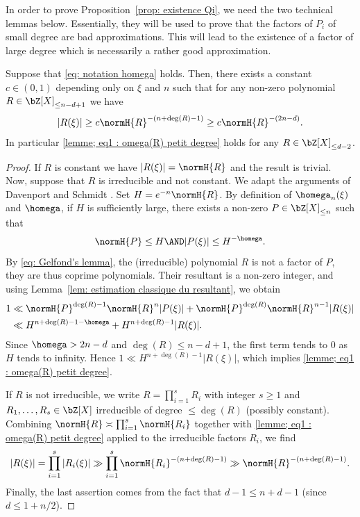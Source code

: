 In order to prove Proposition~\ref{prop: existence Qi}, we need the two technical lemmas below. Essentially, they will be used to prove that the factors of $P_i$ of small degree are bad approximations. This will lead to the existence of a factor of large degree which is necessarily a rather good approximation.

\begin{Lem}
\label{lemme: omega(R) petit degre}
Suppose that \eqref{eq: notation homega} holds. Then, there exists a constant $c\in(0,1)$ depending only on $\xi$ and $n$ such that for any non-zero polynomial $R\in \bZ[X]_{\leq n-d+1}$ we have
\begin{equation}
\label{lemme; eq1 : omega(R) petit degree}
|R(\xi)| \geq c\normH{R}^{-(n + \deg(R) - 1)} \geq c\normH{R}^{-(2n-d)}.
\end{equation}
In particular \eqref{lemme; eq1 : omega(R) petit degree} holds for any $R\in\bZ[X]_{\leq d-2}$.
\end{Lem}

\begin{proof}
If $R$ is constant we have $|R(\xi)| = \normH{R}$ and the result is trivial. Now, suppose that $R$ is irreducible and not constant. We adapt the arguments of Davenport and Schmidt \cite[\S 5--6]{davenport1969approximation}. Set $H = e^{-n}\normH{R}$. By definition of $\homega_n(\xi)$ and $\homega$, if $H$ is sufficiently large, there exists a non-zero $P\in\bZ[X]_{\leq n}$ such that
\[
\normH{P} \leq H \AND |P(\xi)| \leq H^{-\homega}.
\]
By \eqref{eq: Gelfond's lemma}, the (irreducible) polynomial $R$ is not a factor of $P$, they are thus coprime polynomials. Their resultant is a non-zero integer, and using Lemma~\ref{lem: estimation classique du resultant}, we obtain
\begin{align*}
1 & \ll \normH{P}^{\deg(R)-1}\normH{R}^{n}|P(\xi)| + \normH{P}^{\deg(R)}\normH{R}^{n-1}|R(\xi)| \\
& \ll H^{n+\deg(R)-1-\homega} + H^{n+\deg(R)-1}|R(\xi)|.
\end{align*}
Since $\homega > 2n-d$ and $\deg(R) \leq n-d+1$, the first term tends to $0$ as $H$ tends to infinity. Hence $ 1 \ll H^{n+\deg(R)-1}|R(\xi)|$, which implies \eqref{lemme; eq1 : omega(R) petit degree}.

If $R$ is not irreducible, we write $R = \prod_{i=1}^{s}R_i$ with integer $s\geq 1$ and $R_1,\dots,R_s\in\bZ[X]$ irreducible of degree $\leq \deg(R)$ (possibly constant). Combining $\normH{R} \asymp \prod_{i=1}^{s}\normH{R_i}$ together with \eqref{lemme; eq1 : omega(R) petit degree} applied to the irreducible factors $R_i$, we find
\begin{equation*}
|R(\xi)| = \prod_{i=1}^{s}|R_i(\xi)| \gg \prod_{i=1}^{s}\normH{R_i}^{-(n + \deg(R) - 1)} \gg \normH{R}^{-(n + \deg(R) - 1)}.
\end{equation*}
Finally, the last assertion comes from the fact that $d-1\leq n+d-1$ (since $d\leq 1+n/2$).
\end{proof}

